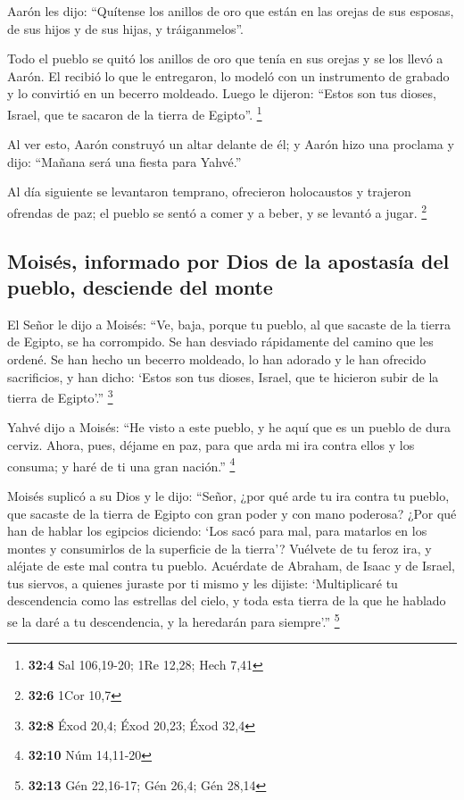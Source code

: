  Aarón les dijo: ``Quítense los anillos de oro que están
en las orejas de sus esposas, de sus hijos y de sus hijas, y
tráiganmelos''.

 Todo el pueblo se quitó los anillos de oro que tenía en
sus orejas y se los llevó a Aarón.  El recibió lo que le
entregaron, lo modeló con un instrumento de grabado y lo convirtió en un
becerro moldeado. Luego le dijeron: ``Estos son tus dioses, Israel, que
te sacaron de la tierra de Egipto''. \footnote{\textbf{32:4} Sal
  106,19-20; 1Re 12,28; Hech 7,41}

 Al ver esto, Aarón construyó un altar delante de él; y
Aarón hizo una proclama y dijo: ``Mañana será una fiesta para Yahvé.''

 Al día siguiente se levantaron temprano, ofrecieron
holocaustos y trajeron ofrendas de paz; el pueblo se sentó a comer y a
beber, y se levantó a jugar. \footnote{\textbf{32:6} 1Cor 10,7}

\hypertarget{moisuxe9s-informado-por-dios-de-la-apostasuxeda-del-pueblo-desciende-del-monte}{%
\subsection{Moisés, informado por Dios de la apostasía del pueblo,
desciende del
monte}\label{moisuxe9s-informado-por-dios-de-la-apostasuxeda-del-pueblo-desciende-del-monte}}

 El Señor le dijo a Moisés: ``Ve, baja, porque tu pueblo,
al que sacaste de la tierra de Egipto, se ha corrompido. 
Se han desviado rápidamente del camino que les ordené. Se han hecho un
becerro moldeado, lo han adorado y le han ofrecido sacrificios, y han
dicho: `Estos son tus dioses, Israel, que te hicieron subir de la tierra
de Egipto'.'' \footnote{\textbf{32:8} Éxod 20,4; Éxod 20,23; Éxod 32,4}

 Yahvé dijo a Moisés: ``He visto a este pueblo, y he aquí
que es un pueblo de dura cerviz.  Ahora, pues, déjame en
paz, para que arda mi ira contra ellos y los consuma; y haré de ti una
gran nación.'' \footnote{\textbf{32:10} Núm 14,11-20}

 Moisés suplicó a su Dios y le dijo: ``Señor, ¿por qué
arde tu ira contra tu pueblo, que sacaste de la tierra de Egipto con
gran poder y con mano poderosa?  ¿Por qué han de hablar
los egipcios diciendo: `Los sacó para mal, para matarlos en los montes y
consumirlos de la superficie de la tierra'? Vuélvete de tu feroz ira, y
aléjate de este mal contra tu pueblo.  Acuérdate de
Abraham, de Isaac y de Israel, tus siervos, a quienes juraste por ti
mismo y les dijiste: `Multiplicaré tu descendencia como las estrellas
del cielo, y toda esta tierra de la que he hablado se la daré a tu
descendencia, y la heredarán para siempre'.'' \footnote{\textbf{32:13}
  Gén 22,16-17; Gén 26,4; Gén 28,14}

